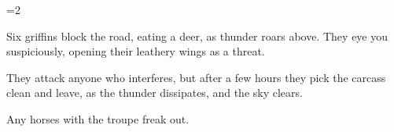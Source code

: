 \ifnum\value{cycle}=2

\begin{boxtext}
  Six \glspl{griffin} block the road, eating a deer, as thunder roars above.
  They eye you suspiciously, opening their leathery wings as a threat.
\end{boxtext}


They attack anyone who interferes, but after a few hours they pick the carcass clean and leave, as the thunder dissipates, and the sky clears.

Any horses with the troupe freak out.

\fi
